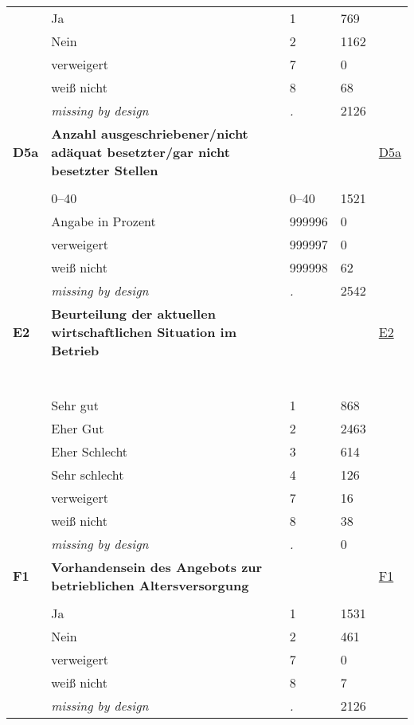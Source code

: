 \begin{longtable}{| L{2.65cm} | L{8cm} | C{1.5cm} | R{1.25cm} | C{2.25cm}  |}
   & Ja & 1 & 769 &  \\ 
   & Nein & 2 & 1162 &  \\ 
   & verweigert & 7 & 0 &  \\ 
   & weiß nicht & 8 & 68 &  \\ 
   & \textit{missing by design} & \textit{.} & 2126 &  \\ 
   \midrule
\textbf{D5a}\label{var:D5a} & \textbf{Anzahl ausgeschriebener/nicht adäquat besetzter/gar nicht besetzter Stellen} &  &  & \hyperref[D5a]{D5a} \\ 
   &  &  &  &  \\ 
   & 0--40 & 0--40 & 1521 &  \\ 
   & Angabe in Prozent & 999996 & 0 &  \\ 
   & verweigert & 999997 & 0 &  \\ 
   & weiß nicht & 999998 & 62 &  \\ 
   & \textit{missing by design} & \textit{.} & 2542 &  \\ 
   \midrule
\textbf{E2}\label{var:E2} & \textbf{Beurteilung der aktuellen wirtschaftlichen Situation im Betrieb} &  &  & \hyperref[E2]{E2} \\ 
   & \protect\subsection[Variablen E2 bis ORDER07\_I3]{} &  &  &  \\ 
   & Sehr gut & 1 & 868 &  \\ 
   & Eher Gut & 2 & 2463 &  \\ 
   & Eher Schlecht & 3 & 614 &  \\ 
   & Sehr schlecht & 4 & 126 &  \\ 
   & verweigert & 7 & 16 &  \\ 
   & weiß nicht & 8 & 38 &  \\ 
   & \textit{missing by design} & \textit{.} & 0 &  \\ 
   \midrule
\textbf{F1}\label{var:F1} & \textbf{Vorhandensein des Angebots zur betrieblichen Altersversorgung} &  &  & \hyperref[F1]{F1} \\ 
   &  &  &  &  \\ 
   & Ja & 1 & 1531 &  \\ 
   & Nein & 2 & 461 &  \\ 
   & verweigert & 7 & 0 &  \\ 
   & weiß nicht & 8 & 7 &  \\ 
   & \textit{missing by design} & \textit{.} & 2126 &  \\ 

\end{longtable}
